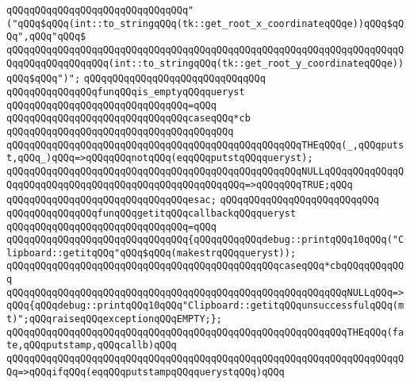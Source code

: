 \verb|qQQqqQQqqQQqqQQqqQQqqQQqqQQqqQQq"("qQQq$qQQq(int::to_stringqQQq(tk::get_root_x_coordinateqQQqe))qQQq$qQQq",qQQq"qQQq$|\newline
\verb|qQQqqQQqqQQqqQQqqQQqqQQqqQQqqQQqqQQqqQQqqQQqqQQqqQQqqQQqqQQqqQQqqQQqqQQqqQQqqQQqqQQqqQQq(int::to_stringqQQq(tk::get_root_y_coordinateqQQqe))qQQq$qQQq")";|\newline
\newline
\verb|qQQqqQQqqQQqqQQqqQQqqQQqqQQqqQQq|\newline
\verb|qQQqqQQqqQQqqQQqfunqQQqis_emptyqQQqqueryst|\newline
\verb|qQQqqQQqqQQqqQQqqQQqqQQqqQQqqQQq=qQQq|\newline
\verb|qQQqqQQqqQQqqQQqqQQqqQQqqQQqqQQqcaseqQQq*cb|\newline
\verb|qQQqqQQqqQQqqQQqqQQqqQQqqQQqqQQqqQQqqQQq|\newline
\verb|qQQqqQQqqQQqqQQqqQQqqQQqqQQqqQQqqQQqqQQqqQQqqQQqqQQqTHEqQQq(_,qQQqputst,qQQq_)qQQq=>qQQqqQQqnotqQQq(eqqQQqputstqQQqqueryst);|\newline
\verb|qQQqqQQqqQQqqQQqqQQqqQQqqQQqqQQqqQQqqQQqqQQqqQQqqQQqNULLqQQqqQQqqQQqqQQqqQQqqQQqqQQqqQQqqQQqqQQqqQQqqQQqqQQqqQQq=>qQQqqQQqTRUE;qQQq|\newline
\verb|qQQqqQQqqQQqqQQqqQQqqQQqqQQqqQQqesac;|\newline
\verb|qQQqqQQqqQQqqQQqqQQqqQQqqQQq|\newline
\verb|qQQqqQQqqQQqqQQqfunqQQqgetitqQQqcallbackqQQqqueryst|\newline
\verb|qQQqqQQqqQQqqQQqqQQqqQQqqQQqqQQq=qQQq|\newline
\verb|qQQqqQQqqQQqqQQqqQQqqQQqqQQqqQQq{qQQqqQQqqQQqdebug::printqQQq10qQQq("Clipboard::getitqQQq"qQQq$qQQq(makestrqQQqqueryst));|\newline
\newline
\verb|qQQqqQQqqQQqqQQqqQQqqQQqqQQqqQQqqQQqqQQqqQQqqQQqcaseqQQq*cbqQQqqQQqqQQq|\newline
\newline
\verb|qQQqqQQqqQQqqQQqqQQqqQQqqQQqqQQqqQQqqQQqqQQqqQQqqQQqqQQqqQQqNULLqQQq=>qQQq{qQQqdebug::printqQQq10qQQq"Clipboard::getitqQQqunsuccessfulqQQq(mt)";qQQqraiseqQQqexceptionqQQqEMPTY;};|\newline
\newline
\verb|qQQqqQQqqQQqqQQqqQQqqQQqqQQqqQQqqQQqqQQqqQQqqQQqqQQqqQQqqQQqTHEqQQq(fate,qQQqputstamp,qQQqcallb)qQQq|\newline
\verb|qQQqqQQqqQQqqQQqqQQqqQQqqQQqqQQqqQQqqQQqqQQqqQQqqQQqqQQqqQQqqQQqqQQqqQQq=>qQQqifqQQq(eqqQQqputstampqQQqquerystqQQq)qQQq|\newline
